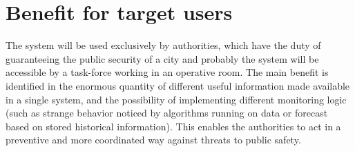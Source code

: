 \documentclass[../main.tex]{subfiles}
\begin{document}
    \section{Benefit for target users}
    The system will be used exclusively by authorities, which have the duty of guaranteeing the public security of a city and probably the system will be accessible by a task-force working in an operative room.
    The main benefit is identified in the enormous quantity of different useful information made available in a single system, and the possibility of implementing different monitoring logic (such as strange behavior noticed by algorithms running on data or forecast based on stored  historical information). This enables the authorities to act in a preventive and more coordinated way against threats to public safety.
\end{document}
